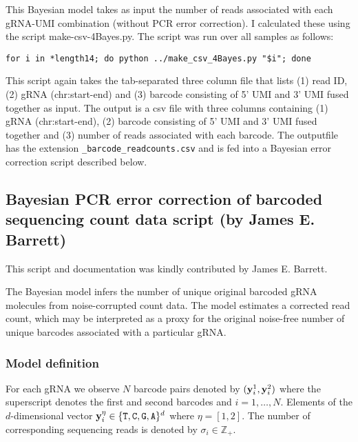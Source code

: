 This Bayesian model takes as input the number of reads associated with each gRNA-UMI combination (without PCR error correction). I calculated these using the script make-csv-4Bayes.py. The script was run over all samples as follows:

\begin{small}\begin{lstlisting}
for i in *length14; do python ../make_csv_4Bayes.py "$i"; done
\end{lstlisting}\end{small}

This script again takes the tab-separated three column file that lists (1) read ID, (2) gRNA (chr:start-end) and (3) barcode consisting of 5' UMI and 3' UMI fused together as input. The output is a csv file with three columns containing (1) gRNA (chr:start-end), (2) barcode consisting of 5' UMI and 3' UMI fused together and (3) number of reads associated with each barcode. The outputfile has the extension \verb|_barcode_readcounts.csv| and is  fed into a Bayesian error correction script described below.

\subsection{Bayesian PCR error correction of barcoded sequencing count data script (by James E. Barrett)}
\label{sec:Bayesian-methods}

This script and documentation was kindly contributed by James E. Barrett. 

The Bayesian model infers the number of unique original barcoded gRNA molecules from noise-corrupted count data. The model estimates a corrected read count, which may be interpreted as a proxy for the original noise-free number of unique barcodes associated with a particular gRNA. 

\subsubsection{Model definition}
For each gRNA we observe $N$ barcode pairs denoted by $(\boldsymbol{\mathbf{y}}_{i}^1,\boldsymbol{\mathbf{y}}_{i}^2)$ where the superscript denotes the first and second barcodes and $i=1,\ldots,N$. Elements of the $d$-dimensional vector $\vecy_{i}^{\eta}\in\{\verb+T+,\verb+C+,\verb+G+,\verb+A+\}^d$ where $\eta=[1,2]$. The number of corresponding sequencing reads is denoted by $\sigma_{i}\in\mathbb{Z}_+$. 

